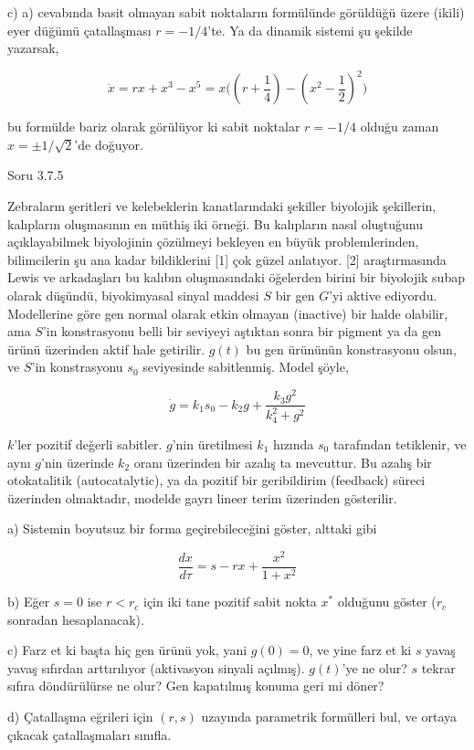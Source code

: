 \documentclass[12pt,fleqn]{article}\usepackage{../../common}
\begin{document}
c) a) cevabında basit olmayan sabit noktaların formülünde görüldüğü üzere
(ikili) eyer düğümü çatallaşması $r=-1/4$'te. Ya da dinamik sistemi şu şekilde
yazarsak,

$$ \dot{x} = rx + x^3 - x^5 = x \bigg( (r+\frac{1}{4}) - (x^2 - \frac{1}{2})^2  \bigg) $$

bu formülde bariz olarak görülüyor ki sabit noktalar $r=-1/4$ olduğu zaman
$x = \pm 1/\sqrt{2}$'de doğuyor. 

Soru 3.7.5

Zebraların şeritleri ve kelebeklerin kanatlarındaki şekiller biyolojik
şekillerin, kalıpların oluşmasının en müthiş iki örneği. Bu kalıpların nasıl
oluştuğunu açıklayabilmek biyolojinin çözülmeyi bekleyen en büyük
problemlerinden, bilimcilerin şu ana kadar bildiklerini [1] çok güzel
anlatıyor. [2] araştırmasında Lewis ve arkadaşları bu kalıbın oluşmasındaki
öğelerden birini bir biyolojik subap olarak düşündü, biyokimyasal sinyal maddesi
$S$ bir gen $G$'yi aktive ediyordu. Modellerine göre gen normal olarak etkin
olmayan (inactive) bir halde olabilir, ama $S$'in konstrasyonu belli bir
seviyeyi aştıktan sonra bir pigment ya da gen ürünü üzerinden aktif hale
getirilir. $g(t)$ bu gen ürününün konstrasyonu olsun, ve $S$'in konstrasyonu
$s_0$ seviyesinde sabitlenmiş. Model şöyle,

$$ \dot{g} = k_1s_0 - k_2g + \frac{k_3 g^2}{k_4^2 + g^2} $$

$k$'ler pozitif değerli sabitler. $g$'nin üretilmesi $k_1$ hızında $s_0$
tarafından tetiklenir, ve aynı $g$'nin üzerinde $k_2$ oranı üzerinden bir azalış
ta mevcuttur. Bu azalış bir otokatalitik (autocatalytic), ya da pozitif bir
geribildirim (feedback) süreci üzerinden olmaktadır, modelde gayrı lineer terim
üzerinden gösterilir.

a) Sistemin boyutsuz bir forma geçirebileceğini göster, alttaki gibi

$$ \frac{dx}{d\tau} = s - rx  + \frac{x^2}{1+x^2} $$

b) Eğer $s=0$ ise $r<r_c$ için iki tane pozitif sabit nokta $x^\ast$ olduğunu
göster ($r_c$ sonradan hesaplanacak).

c) Farz et ki başta hiç gen ürünü yok, yani $g(0) = 0 $, ve yine farz et ki $s$
yavaş yavaş sıfırdan arttırılıyor (aktivasyon sinyali açılmış). $g(t)$'ye ne
olur? $s$ tekrar sıfıra döndürülürse ne olur? Gen kapatılmış konuma geri mi
döner?

d) Çatallaşma eğrileri için $(r,s)$ uzayında parametrik formülleri bul, ve
ortaya çıkacak çatallaşmaları sınıfla.
\end{document}
